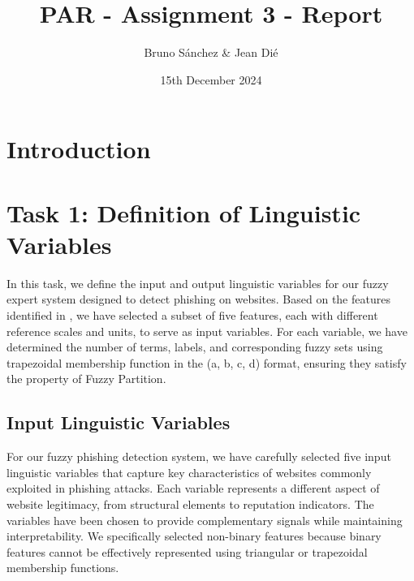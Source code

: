\documentclass{article}
\begin{document}
\title{PAR - Assignment 3 - Report}
\author{\normalsize Bruno Sánchez \& Jean Dié}
\date{\small 15th December 2024}

\maketitle

\newpage
\tableofcontents
\newpage

\section{Introduction}


\section{Task 1: Definition of Linguistic Variables}

In this task, we define the input and output linguistic variables for our fuzzy expert system designed to detect phishing on websites. Based on the features identified in \cite{Hannousse2020-eq}, we have selected a subset of five features, each with different reference scales and units, to serve as input variables. For each variable, we have determined the number of terms, labels, and corresponding fuzzy sets using trapezoidal membership function in the (a, b, c, d) format, ensuring they satisfy the property of Fuzzy Partition.



\subsection{Input Linguistic Variables}

For our fuzzy phishing detection system, we have carefully selected five input linguistic variables that capture key characteristics of websites commonly exploited in phishing attacks. Each variable represents a different aspect of website legitimacy, from structural elements to reputation indicators. The variables have been chosen to provide complementary signals while maintaining interpretability. We specifically selected non-binary features because binary features cannot be effectively represented using triangular or trapezoidal membership functions.
\end{document}
